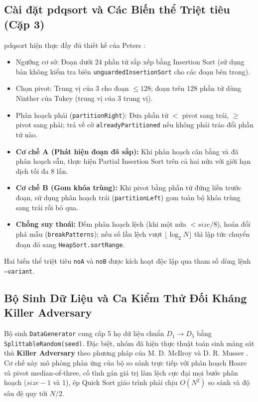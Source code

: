 \documentclass[conference]{IEEEtran}
\begin{document}
\subsection{Cài đặt pdqsort và Các Biến thể Triệt tiêu (Cặp 3)}
pdqsort hiện thực đầy đủ thiết kế của Peters \cite{peters2021pdqsort}:
\begin{itemize}
    \item Ngưỡng cơ sở: Đoạn dưới 24 phần tử sắp xếp bằng Insertion Sort (sử dụng bản không kiểm tra biên \texttt{unguardedInsertionSort} cho các đoạn bên trong).
    \item Chọn pivot: Trung vị của 3 cho đoạn $\le 128$; đoạn trên 128 phần tử dùng Ninther của Tukey (trung vị của 3 trung vị).
    \item Phân hoạch phải (\texttt{partitionRight}): Đưa phần tử $<$ pivot sang trái, $\ge$ pivot sang phải; trả về cờ \texttt{alreadyPartitioned} nếu không phải tráo đổi phần tử nào.
    \item \textbf{Cơ chế A (Phát hiện đoạn đã sắp):} Khi phân hoạch cân bằng và đã phân hoạch sẵn, thực hiện Partial Insertion Sort trên cả hai nửa với giới hạn dịch tối đa 8 lần.
    \item \textbf{Cơ chế B (Gom khóa trùng):} Khi pivot bằng phần tử đứng liền trước đoạn, sử dụng phân hoạch trái (\texttt{partitionLeft}) gom toàn bộ khóa trùng sang trái rồi bỏ qua.
    \item \textbf{Chống suy thoái:} Đếm phân hoạch lệch (khi một nửa $< size/8$), hoán đổi phá mẫu (\texttt{breakPatterns}); nếu số lần lệch vượt $\lfloor \log_2 N \rfloor$ thì lập tức chuyển đoạn đó sang \texttt{HeapSort.sortRange}.
\end{itemize}
Hai biến thể triệt tiêu \texttt{noA} và \texttt{noB} được kích hoạt độc lập qua tham số dòng lệnh \texttt{--variant}.

\subsection{Bộ Sinh Dữ Liệu và Ca Kiểm Thử Đối Kháng Killer Adversary}
Bộ sinh \texttt{DataGenerator} cung cấp 5 họ dữ liệu chuẩn $D_1 \to D_5$ bằng \texttt{SplittableRandom(seed)}. Đặc biệt, nhóm đã hiện thực thuật toán sinh mảng sát thủ \textbf{Killer Adversary} theo phương pháp của M. D. McIlroy \cite{mcilroy1999killer} và D. R. Musser \cite{musser1997introsort}. Cơ chế này mô phỏng phản ứng của bộ so sánh trực tiếp với phân hoạch Hoare và pivot median-of-three, cố tình gán giá trị làm lệch cực đại mọi bước phân hoạch ($size - 1$ và $1$), ép Quick Sort giáo trình phải chịu $O(N^2)$ so sánh và độ sâu đệ quy tới $N/2$.
\end{document}
